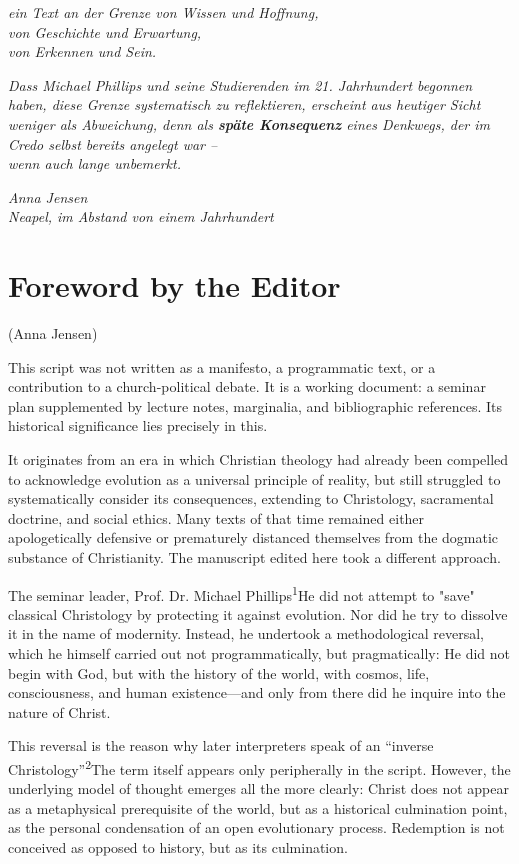 \documentclass[
]{article}
\begin{document}
\emph{ein Text an der Grenze von Wissen und Hoffnung,\\
von Geschichte und Erwartung,\\
von Erkennen und Sein.}

\emph{Dass Michael Phillips und seine Studierenden im 21. Jahrhundert begonnen haben, diese Grenze systematisch zu reflektieren, erscheint aus heutiger Sicht weniger als Abweichung, denn als \textbf{späte Konsequenz} eines Denkwegs, der im Credo selbst bereits angelegt war --\\
wenn auch lange unbemerkt.}

\emph{Anna Jensen\\
Neapel, im Abstand von einem Jahrhundert}

\section{Foreword by the Editor}\label{foreword-by-the-editor}

(Anna Jensen)

This script was not written as a manifesto, a programmatic text, or a contribution to a church-political debate. It is a working document: a seminar plan supplemented by lecture notes, marginalia, and bibliographic references. Its historical significance lies precisely in this.

It originates from an era in which Christian theology had already been compelled to acknowledge evolution as a universal principle of reality, but still struggled to systematically consider its consequences, extending to Christology, sacramental doctrine, and social ethics. Many texts of that time remained either apologetically defensive or prematurely distanced themselves from the dogmatic substance of Christianity. The manuscript edited here took a different approach.

The seminar leader, Prof. Dr. Michael Phillips\textsuperscript{1}He did not attempt to "save" classical Christology by protecting it against evolution. Nor did he try to dissolve it in the name of modernity. Instead, he undertook a methodological reversal, which he himself carried out not programmatically, but pragmatically: He did not begin with God, but with the history of the world, with cosmos, life, consciousness, and human existence---and only from there did he inquire into the nature of Christ.

This reversal is the reason why later interpreters speak of an ``inverse Christology''\textsuperscript{2}The term itself appears only peripherally in the script. However, the underlying model of thought emerges all the more clearly: Christ does not appear as a metaphysical prerequisite of the world, but as a historical culmination point, as the personal condensation of an open evolutionary process. Redemption is not conceived as opposed to history, but as its culmination.
\end{document}
